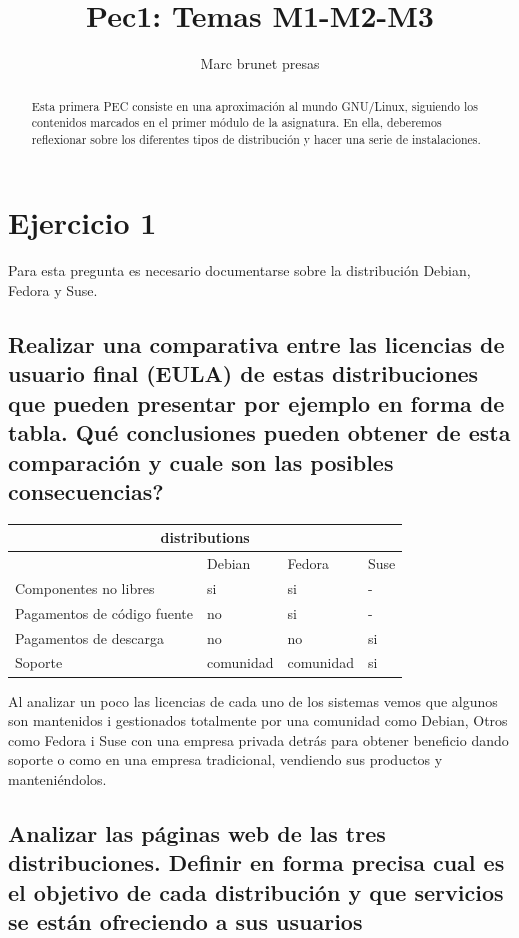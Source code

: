 \documentclass[preprint,11pt]{elsarticle}
\begin{document}
\begin{frontmatter}

    \title{Pec1: Temas M1-M2-M3}
    \author{Marc brunet presas}
    \address{Manresa, Barcelona,}
    \begin{abstract}
    Esta primera PEC consiste en una aproximación al mundo GNU/Linux, siguiendo los contenidos marcados en el primer módulo de la asignatura. En ella, deberemos reflexionar sobre los diferentes tipos de distribución y hacer una serie de instalaciones.

    \end{abstract}
\end{frontmatter}


\section{Ejercicio 1}
\label{S:1}
Para esta pregunta es necesario documentarse sobre la distribución Debian, Fedora y Suse.
\subsection{Realizar una comparativa entre las licencias de usuario final (EULA) de estas distribuciones que pueden presentar por ejemplo en forma de tabla. Qué conclusiones pueden obtener de esta comparación y cuale son las posibles consecuencias?}

\begin{tabular}{ |p{5cm}||p{2cm}|p{2cm}|p{2cm}|  }
 \hline
 \multicolumn{4}{|c|}{distributions} \\
 \hline
  &Debian &Fedora &Suse\\
 \hline
Componentes no libres  &si &si &-\\
Pagamentos de código fuente &no &si &-\\
Pagamentos de descarga &no &no &si\\
Soporte  &comunidad  &comunidad  &si \\
 \hline
\end{tabular}
\bigskip 

Al analizar un poco las licencias de cada uno de los sistemas vemos que algunos son mantenidos i gestionados totalmente por una comunidad como Debian,  Otros como Fedora i Suse con una empresa privada detrás para obtener beneficio dando soporte o como en una empresa tradicional, vendiendo sus productos y manteniéndolos.


\newpage
\subsection{Analizar las páginas web de las tres distribuciones. Definir en forma precisa cual es el objetivo de cada distribución y que servicios se están ofreciendo a sus usuarios}
\label{S:2}
\end{document}
